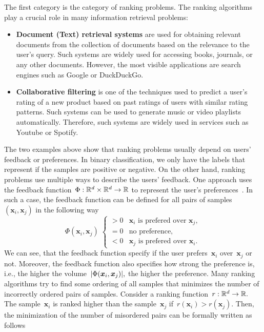 The first category is the category of ranking problems. The ranking algorithms play a crucial role in many information retrieval problems:
\begin{itemize}
  \item \textbf{Document (Text) retrieval systems} are used for obtaining relevant documents from the collection of documents based on the relevance to the user's query. Such systems are widely used for accessing books, journals, or any other documents. However, the most visible applications are search engines such as Google or DuckDuckGo.
  \item \textbf{Collaborative filtering} is one of the techniques used to predict a user's rating of a new product based on past ratings of users with similar rating patterns. Such systems can be used to generate music or video playlists automatically. Therefore, such systems are widely used in services such as Youtube or Spotify.
\end{itemize}
The two examples above show that ranking problems usually depend on users' feedback or preferences. In binary classification, we only have the labels that represent if the samples are positive or negative. On the other hand, ranking problems use multiple ways to describe the users' feedback. One approach uses the feedback function~$\Phi: \mathbb{R}^d \times \mathbb{R}^d \to \mathbb{R}$ to represent the user's preferences~\cite{freund2003efficient}. In such a case, the feedback function can be defined for all pairs of samples~$(\bm{x}_i, \bm{x}_j)$ in the following way
\begin{equation*}
  \Phi(\bm{x}_i, \bm{x}_j) \; 
  \begin{cases}
    > 0 & \bm{x}_i \text{ is prefered over } \bm{x}_j, \\
    = 0 & \text{no preference,} \\
    < 0 & \bm{x}_j \text{ is prefered over } \bm{x}_i.
  \end{cases}
\end{equation*}
We can see, that the feedback function specify if the user prefers~$\bm{x}_i$ over~$\bm{x}_j$ or not. Moreover, the feedback function also specifies how strong the preference is, i.e., the higher the volume~$|\Phi(\bm{x}_i, \bm{x}_j)|,$ the higher the preference. Many ranking algorithms try to find some ordering of all samples that minimizes the number of incorrectly ordered pairs of samples. Consider a ranking function~$r: \mathbb{R}^d \to \mathbb{R}.$ The sample~$\bm{x}_i$ is ranked higher than the sample~$\bm{x}_j$ if~$r(\bm{x}_i) > r(\bm{x}_j).$ Then, the minimization of the number of misordered pairs can be formally written as follows
